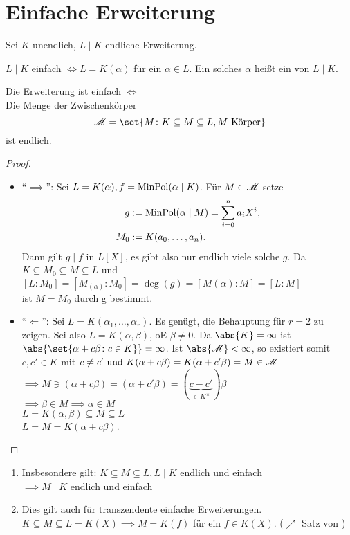 \section{Einfache Erweiterung}
Sei $K$ unendlich, $L \mid K$ endliche Erweiterung.
\begin{remark}
	$L \mid K$ einfach $\Longleftrightarrow L = K(\alpha)$ für ein $\alpha \in L$. Ein solches $\alpha$ heißt ein  von $L \mid K$.
\end{remark}
\begin{proposition}
	Die Erweiterung ist einfach $\Longleftrightarrow$ \\
	Die Menge der Zwischenkörper
	\[
		\Zwischen = \set{M \colon K \subseteq M \subseteq L, M \text{ Körper}}
	\]
	ist endlich.
\end{proposition}
\begin{proof}
	\begin{itemize}\
		\item ``$\implies$'': Sei $L = K(\alpha), f= \operatorname{MinPol}(\alpha \mid K)$. Für $M \in \mathscr M$ setze
		\begin{align*}
			g&:= \operatorname{MinPol}(\alpha \mid M) = \sum_{i=0}^n a_i X^i,\\
			M_0 &:= K(a_0, \dots, a_n).
		\end{align*} 
		Dann gilt $g \mid f$ in $L[X]$, es gibt also nur endlich viele solche $g$. Da $K \subseteq M_0 \subseteq M \subseteq L$ und $[L:M_0] = [M_(\alpha):M_0]= \deg(g) = [M(\alpha):M] = [L:M]$\\
		ist $M = M_0$ durch g bestimmt.
		\item ``$\Longleftarrow$'': Sei $L = K(\alpha_1, \dots, \alpha_r)$. Es genügt, die Behauptung für $r = 2$ zu zeigen. Sei also $L = K(\alpha, \beta)$, oE $\beta \neq 0$. Da $\abs{K} = \infty$ ist $\abs{\set{\alpha + c\beta \colon c \in K}} = \infty$. Ist $\abs{\Zwischen} < \infty$, so existiert somit $c, c' \in K$ mit $c \neq c' \text{ und } K(\alpha + c \beta) = K(\alpha + c' \beta) = M \in \mathscr M$\\
		$\implies M \ni (\alpha + c \beta) = (\alpha + c' \beta) = (\underbrace{c-c'}_{\in K^{\times}})\beta$\\
		$\implies \beta \in M \implies \alpha \in M$\\
		$L = K(\alpha, \beta) \subseteq M \subseteq L$\\
		$L = M = K(\alpha + c\beta)$.
	\end{itemize}
\end{proof}
\begin{remark}
	\begin{enumerate}
		\item Insbesondere gilt:
		$K \subseteq M \subseteq L, L \mid K$ endlich und einfach\\
		$\implies M \mid K$ endlich und einfach
		\item Dies gilt auch für transzendente einfache Erweiterungen. $K \subseteq M \subseteq L = K(X) \implies M = K(f)$ für ein $f \in K(X)$. ($\nearrow$ Satz von )
	\end{enumerate}
\end{remark}
